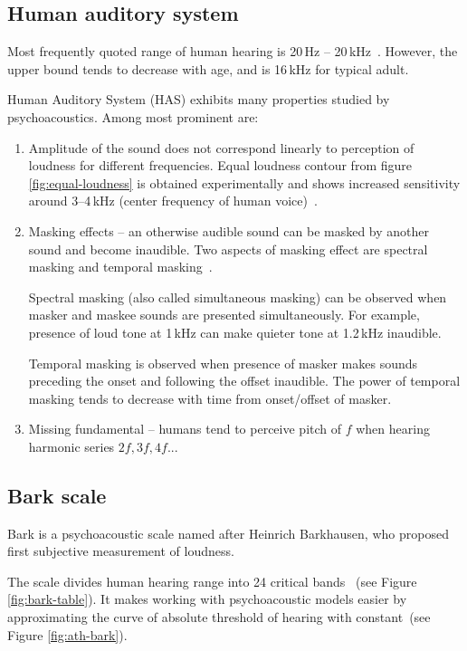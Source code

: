 \subsection{Human auditory system}
\label{subsec:human-auditory}

Most frequently quoted range of human hearing is 20\,Hz -- 20\,kHz~\cite{HearPsych}.
However, the upper bound tends to decrease with age, and is 16\,kHz for typical adult.

Human Auditory System (HAS) exhibits many properties studied by psychoacoustics. Among most prominent are:

\begin{enumerate}
\item Amplitude of the sound does not correspond linearly to perception of loudness for different frequencies. Equal loudness contour from figure \ref{fig:equal-loudness} is obtained experimentally and shows increased sensitivity around 3--4\,kHz (center frequency of human voice)~\cite{DigiCoding}\cite{DigiAudio}.

\item Masking effects -- an otherwise audible sound can be masked by another sound and become inaudible.
Two aspects of masking effect are spectral masking and temporal masking~\cite{ASP}.\label{itm:masking-effects}

Spectral masking (also called simultaneous masking) can be observed when masker and maskee sounds are presented simultaneously. For example, presence of loud tone at 1\,kHz can make quieter tone at 1.2\,kHz inaudible.

Temporal masking is observed when presence of masker makes sounds preceding the onset and following the offset inaudible. The power of temporal masking tends to decrease with time from onset/offset of masker.

\item Missing fundamental -- humans tend to perceive pitch of $f$ when hearing harmonic series $2f, 3f, 4f ...$
\end{enumerate}

\subsection{Bark scale}

Bark is a psychoacoustic scale named after Heinrich Barkhausen, who proposed first subjective measurement of loudness.

The scale divides human hearing range into 24 critical bands~\cite{Bark} (see Figure \ref{fig:bark-table}).
It makes working with psychoacoustic models easier by approximating the curve of absolute threshold of hearing with constant~(see Figure \ref{fig:ath-bark}).

